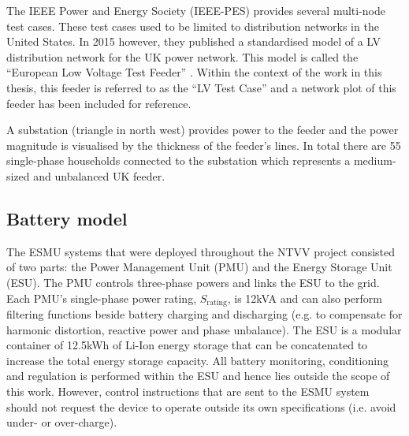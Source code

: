 The IEEE Power and Energy Society (IEEE-PES) provides several multi-node test cases.
These test cases used to be limited to distribution networks in the United States.
In 2015 however, they published a standardised model of a LV distribution network for the UK power network.
This model is called the ``European Low Voltage Test Feeder'' \cite{DistributionTestFeeders2017}.
Within the context of the work in this thesis, this feeder is referred to as the ``LV Test Case'' and a network plot of this feeder has been included for reference.



A substation (triangle in north west) provides power to the feeder and the power magnitude is visualised by the thickness of the feeder's lines.
In total there are 55 single-phase households connected to the substation which represents a medium-sized and unbalanced UK feeder.

\subsection{Battery model}
\label{ch1:subsec:battery-model}


The ESMU systems that were deployed throughout the NTVV project consisted of two parts: the Power Management Unit (PMU) and the Energy Storage Unit (ESU).
The PMU controls three-phase powers and links the ESU to the grid.
Each PMU's single-phase power rating, $S_\text{rating}$, is 12kVA and can also perform filtering functions beside battery charging and discharging (e.g. to compensate for harmonic distortion, reactive power and phase unbalance).
The ESU is a modular container of 12.5kWh of Li-Ion energy storage that can be concatenated to increase the total energy storage capacity.
All battery monitoring, conditioning and regulation is performed within the ESU and hence lies outside the scope of this work.
However, control instructions that are sent to the ESMU system should not request the device to operate outside its own specifications (i.e. avoid under- or over-charge).

\nomenclature[I]{$\eta$}{Round-trip efficiency of power electronics, where $\eta \in (0, 1]$}

